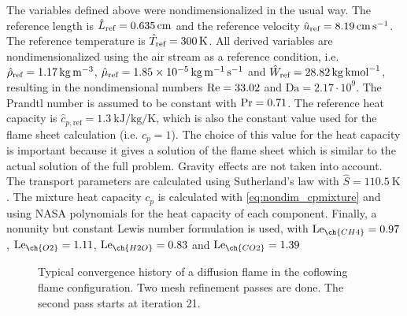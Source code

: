 The variables defined above were nondimensionalized in the usual way. The reference length is $\hat L_{\text{ref}} =  \SI{0.635}{\centi \meter}$ and the reference velocity $\hat u_{\text{ref}} =\SI{8.19}{\centi \meter \per \second}$. The reference temperature is $\hat T_{\text{ref}} =\SI{300}{K}$.  All derived variables are nondimensionalized using the air stream as a reference condition, i.e. $\hat \rho_{\text{ref}} = \SI{1.17}{\kilo \gram \per \cubic \meter}$, $\hat \mu_{\text{ref}} = \SI{1.85e-5}{\kilo \gram \per \meter \per \second}$ and $\hat W_{\text{ref}} = \SI{28.82}{\kilo \gram \per \kilo\mole}$, resulting in the nondimensional numbers $\text{Re} = 33.02$ and $\text{Da} = 2.17\cdot 10^9$. The Prandtl number is assumed to be constant with $\text{Pr} = 0.71$. The reference heat capacity is $\hat{c}_{p,\text{ref}}= \SI{1.3}{\kilo \joule \per \kilo \gram \per \kelvin}$, which is also the constant value used for the flame sheet calculation (i.e. $c_p = 1$). The choice of this value for the heat capacity is important because it gives a solution of the flame sheet which is similar to the actual solution of the full problem. Gravity effects are not taken into account. The transport parameters are calculated using Sutherland's law with $\hat{S} = \SI{110.5}{\kelvin}$. The mixture heat capacity $c_p$ is calculated with \cref{eq:nondim_cpmixture} and using NASA polynomials for the heat capacity of each component. Finally, a nonunity but constant Lewis number formulation is used, with
$\Lewis_{\ch{CH4}} =  0.97 $ , $\Lewis_{\ch{O2}} = 1.11 $, $\Lewis_{\ch{H2O}} = 0.83 $ and $\Lewis_{\ch{CO2}} = 1.39 $ \parencite{smookePremixedNonpremixedTest1991}
\begin{figure}[b!]
	\centering
	\caption{Typical convergence history of a diffusion flame in the coflowing flame configuration. Two mesh refinement passes are done. The second pass starts at iteration 21. }
	\label{fig:CoFlow_ConvergenceStory}
\end{figure}
